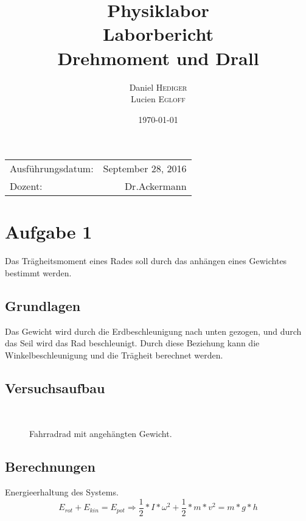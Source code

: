 \documentclass{article}
\title{Physiklabor \\ Laborbericht \\ Drehmoment und Drall} %
\author{Daniel \textsc{Hediger} \\ Lucien \textsc{Egloff}} %
\date{\today} %
\begin{document}
\maketitle %

\begin{center}
\begin{tabular}{l r}
Ausführungsdatum: & September 28, 2016 \\ %
Dozent: & Dr.Ackermann %
\end{tabular}
\end{center}
\newpage
\tableofcontents 

\newpage
\section{Aufgabe 1}


Das Trägheitsmoment eines Rades soll durch das anhängen eines Gewichtes bestimmt werden.

\subsection{Grundlagen}

Das Gewicht wird durch die Erdbeschleunigung nach unten gezogen, und durch das Seil wird das Rad beschleunigt. Durch diese Beziehung kann die Winkelbeschleunigung und die Trägheit berechnet werden.

\subsection{Versuchsaufbau}
\begin{figure}[h]
\center

\caption{Fahrradrad mit angehängten Gewicht.}
\
\end{figure}

\subsection{Berechnungen}
Energieerhaltung des Systems.\begin{equation}
E_{rot}+E_{kin}=E_{pot}  \Rightarrow\frac{1}{2}*I*\omega^2+\frac{1}{2}*m*v^2=m*g*h
\end{equation}
\end{document}
